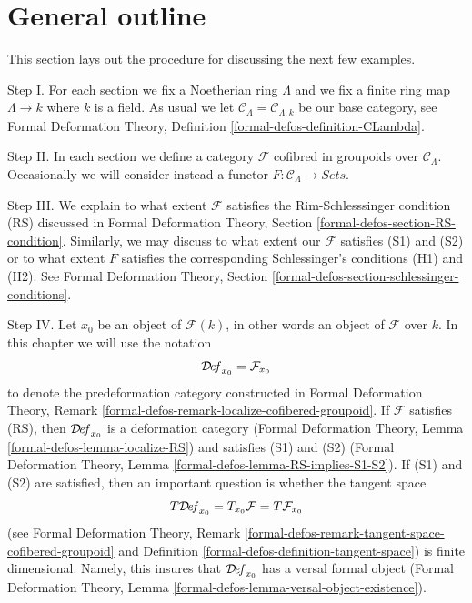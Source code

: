 \section{General outline}
\label{section-general}

\noindent
This section lays out the procedure for discussing the next few examples.

\medskip\noindent
Step I. For each section we fix a Noetherian ring $\Lambda$ and
we fix a finite ring map $\Lambda \to k$ where $k$ is a field.
As usual we let $\mathcal{C}_\Lambda = \mathcal{C}_{\Lambda, k}$
be our base category, see
Formal Deformation Theory,
Definition \ref{formal-defos-definition-CLambda}.

\medskip\noindent
Step II. In each section we define a category $\mathcal{F}$
cofibred in groupoids over $\mathcal{C}_\Lambda$. Occasionally
we will consider instead a functor
$F : \mathcal{C}_\Lambda \to \textit{Sets}$.

\medskip\noindent
Step III. We explain to what extent $\mathcal{F}$ satisfies
the Rim-Schlesssinger condition (RS) discussed in
Formal Deformation Theory, Section \ref{formal-defos-section-RS-condition}.
Similarly, we may discuss to what extent our $\mathcal{F}$
satisfies (S1) and (S2) or to what extent $F$ satisfies
the corresponding Schlessinger's conditions (H1) and (H2).
See Formal Deformation Theory, Section
\ref{formal-defos-section-schlessinger-conditions}.

\medskip\noindent
Step IV. Let $x_0$ be an object of $\mathcal{F}(k)$, in other words an object
of $\mathcal{F}$ over $k$. In this chapter we will use the notation
$$
\mathcal{D}\!\mathit{ef}_{x_0} = \mathcal{F}_{x_0}
$$
to denote the predeformation category constructed in
Formal Deformation Theory, Remark
\ref{formal-defos-remark-localize-cofibered-groupoid}.
If $\mathcal{F}$ satisfies (RS), then
$\mathcal{D}\!\mathit{ef}_{x_0}$ is a deformation category
(Formal Deformation Theory, Lemma
\ref{formal-defos-lemma-localize-RS})
and satisfies (S1) and (S2)
(Formal Deformation Theory, Lemma
\ref{formal-defos-lemma-RS-implies-S1-S2}).
If (S1) and (S2) are satisfied, then
an important question is whether the tangent space
$$
T\mathcal{D}\!\mathit{ef}_{x_0} = T_{x_0}\mathcal{F} = T\mathcal{F}_{x_0}
$$
(see Formal Deformation Theory, Remark
\ref{formal-defos-remark-tangent-space-cofibered-groupoid} and
Definition \ref{formal-defos-definition-tangent-space})
is finite dimensional. Namely, this insures that
$\mathcal{D}\!\mathit{ef}_{x_0}$ has a versal formal object
(Formal Deformation Theory, Lemma
\ref{formal-defos-lemma-versal-object-existence}).

